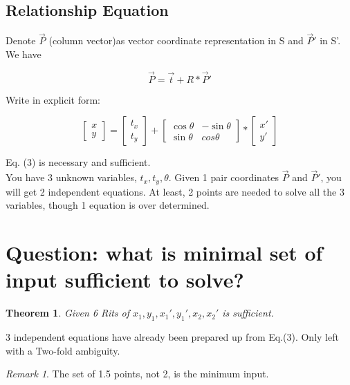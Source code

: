 \documentclass[letterpaper, 10 pt, conference]{ieeeconf}  %
\newtheorem{myTheo}{Theorem}
\theoremstyle{remark}
\newtheorem{myrem}{Remark}
\begin{document}
\subsection{Relationship Equation}

Denote $\vec{P}$ (column vector)as vector coordinate representation in S and $\vec{P}'$ in S'. We have

\begin{equation}
\vec{P} = \vec{t} + R*\vec{P}' 
\end{equation}

Write in explicit form:

\begin{equation}
\begin{bmatrix}
x\\
y
\end{bmatrix}
=
\begin{bmatrix}
t_x \\
t_y
\end{bmatrix}
+
\begin{bmatrix}
\cos{\theta}&-\sin{\theta}\\
\sin{\theta}&cos{\theta}
\end{bmatrix}
*
\begin{bmatrix}
x' \\
y'
\end{bmatrix}
\end{equation}

Eq. (3) is necessary and sufficient.\\ 
You have 3 unknown variables, $t_x, t_y, \theta$. Given 1 pair coordinates $\vec{P}$ and $\vec{P}'$, you will get 2 independent equations. At least,  2 points are needed to solve all the 3 variables, though 1 equation is over determined. \\

\section{Question: what is minimal set of input sufficient to solve?}
\begin{myTheo}
Given 6 Rits of $x_1,y_1,x_1',y_1',x_2,x_2'$ is sufficient.
\end{myTheo}
3 independent equations have already been prepared up from Eq.(3). Only left with a Two-fold ambiguity.\\

\begin{myrem}
The set of 1.5 points, not 2,  is the minimum input.  
\end{myrem}
\end{document}

